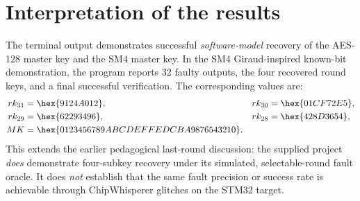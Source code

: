 \section{Interpretation of the results}
The terminal output demonstrates successful \emph{software-model} recovery of the AES-128 master key and the SM4 master key. In the SM4 Giraud-inspired known-bit demonstration, the program reports 32 faulty outputs, the four recovered round keys, and a final successful verification. The corresponding values are:
\begin{align*}
rk_{31}&=\hex{9124A012}, & rk_{30}&=\hex{01CF72E5},\\
rk_{29}&=\hex{62293496}, & rk_{28}&=\hex{428D3654},\\
MK&=\hex{01234567\allowbreak{}89ABCDEF\allowbreak{}FEDCBA98\allowbreak{}76543210}.
\end{align*}
This extends the earlier pedagogical last-round discussion: the supplied project \emph{does} demonstrate four-subkey recovery under its simulated, selectable-round fault oracle. It does \emph{not} establish that the same fault precision or success rate is achievable through ChipWhisperer glitches on the STM32 target.
